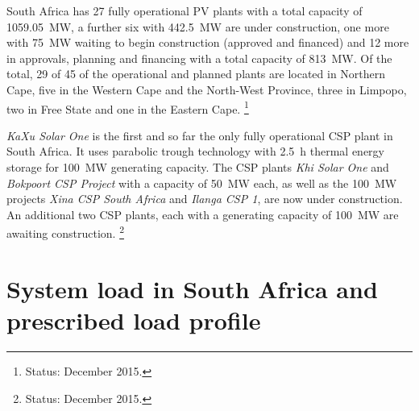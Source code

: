 South Africa has 27 fully operational PV plants with a total capacity of \SI{1059.05}{\mega\watt}, a further six with \SI{442.5}{\mega\watt} are under construction, one more with \SI{75}{\mega\watt} waiting to begin construction (approved and financed) and 12 more in approvals, planning and financing with a total capacity of \SI{813}{\mega\watt}. Of the total, 29 of 45 of the operational and planned plants are located in Northern Cape, five in the Western Cape and the North-West Province, three in Limpopo, two in Free State and one in the Eastern Cape. \cite{Forder2015}\footnote{Status: December 2015.}


\emph{KaXu Solar One} is the first and so far the only fully operational \ac{CSP} plant in South Africa. It uses parabolic trough technology with \SI{2.5}{\hour} thermal energy storage for \SI{100}{\mega\watt} generating capacity. The \ac{CSP} plants \emph{Khi Solar One} and \emph{Bokpoort CSP Project} with a capacity of \SI{50}{\mega\watt} each, as well as the \SI{100}{\mega\watt} projects \emph{Xina CSP South Africa} and \emph{Ilanga CSP 1}, are now under construction. An additional two \ac{CSP} plants, each with a generating capacity of \SI{100}{\mega\watt} are awaiting construction. \cite{Forder2015}\footnote{Status: December 2015.}
\section{System load in South Africa and prescribed load profile} \label{SystemloadinSA}

